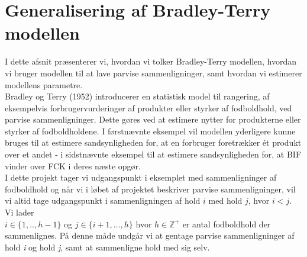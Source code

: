 \documentclass[11pt,a4paper]{article}
\begin{document}
\section{Generalisering af Bradley-Terry modellen}
I dette afsnit præsenterer vi, hvordan vi tolker Bradley-Terry modellen, hvordan vi bruger modellen til at lave parvise sammenligninger, samt hvordan vi estimerer modellens parametre.\\ \newline
Bradley og Terry (1952)\cite{BradleyTerry} introducerer en statistisk model til rangering, af eksempelvis forbrugervurderinger af produkter eller styrker af fodboldhold, ved parvise sammenligninger. Dette gøres ved at estimere nytter for produkterne eller styrker af fodboldholdene. I førstnævnte eksempel vil modellen yderligere kunne bruges til at estimere sandsynligheden for, at en forbruger foretrækker ét produkt over et andet - i sidstnævnte eksempel til at estimere sandsynligheden for, at BIF vinder over FCK i deres næste opgør.\\ I dette projekt tager vi udgangspunkt i eksemplet med sammenligninger af fodboldhold og når vi i løbet af projektet beskriver parvise sammenligninger, vil vi altid tage udgangspunkt i sammenligningen af hold $i$ med hold $j$, hvor $i<j$. Vi lader \\$i \in \{1,..,h-1\}$ og $j\in \{i+1,...,h\}$ hvor $h\in \mathbb{Z}^+$ er antal fodboldhold der sammenlignes. På denne måde undgår vi at gentage parvise sammenligninger af hold \textit{i} og hold \textit{j}, samt at sammenligne hold med sig selv. 
\end{document}
